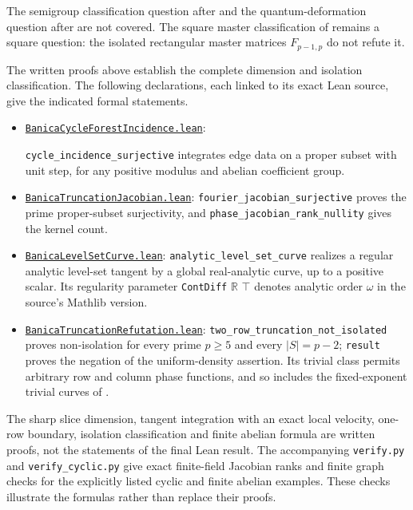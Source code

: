\documentclass[11pt]{article}
\newcommand{\R}{\mathbb R}
\begin{document}
The semigroup classification question after \cite[Theorem~5.9, p.~22]{BOP}
and the quantum-deformation question after \cite[Definition~6.2, p.~22]{BOP}
are not covered. The square master classification of
\cite[Conjecture~3.9]{BOP} remains a square question: the isolated
rectangular master matrices $F_{p-1,p}$ do not refute it.

The written proofs above establish the complete dimension and isolation
classification. The following declarations, each linked to its exact
Lean source, give the indicated formal statements.
\begin{itemize}
\item \href{https://github.com/the-omega-institute/trureturing/blob/43ced8a8460ce89a7c5cae3deeac10e5fc08d565/D5/S3/Quantum/Tomography/Hadamard/BanicaCycleForestIncidence.lean}{\texttt{BanicaCycleForestIncidence.lean}}:
\par\texttt{cycle\_incidence\_surjective} integrates edge data on a proper
subset with unit step, for any positive modulus and abelian coefficient group.
\item \href{https://github.com/the-omega-institute/trureturing/blob/43ced8a8460ce89a7c5cae3deeac10e5fc08d565/D5/S3/Quantum/Tomography/Hadamard/BanicaTruncationJacobian.lean}{\texttt{BanicaTruncationJacobian.lean}}:
\texttt{fourier\_jacobian\_surjective} proves the prime proper-subset
surjectivity, and \texttt{phase\_jacobian\_rank\_nullity} gives the kernel count.
\item \href{https://github.com/the-omega-institute/trureturing/blob/43ced8a8460ce89a7c5cae3deeac10e5fc08d565/D5/S3/Quantum/Tomography/Hadamard/BanicaLevelSetCurve.lean}{\texttt{BanicaLevelSetCurve.lean}}:
\texttt{analytic\_level\_set\_curve} realizes a regular analytic
level-set tangent by a global real-analytic curve, up to a positive scalar.
Its regularity parameter \texttt{ContDiff} $\R$ $\top$ denotes
analytic order $\omega$ in the source's Mathlib version.
\item \href{https://github.com/the-omega-institute/trureturing/blob/43ced8a8460ce89a7c5cae3deeac10e5fc08d565/D5/S3/Quantum/Tomography/Hadamard/BanicaTruncationRefutation.lean}{\texttt{BanicaTruncationRefutation.lean}}:
\texttt{two\_row\_truncation\_not\_isolated} proves non-isolation for every
prime $p\geq5$ and every $|S|=p-2$; \texttt{result} proves the negation
of the uniform-density assertion. Its trivial class permits arbitrary
row and column phase functions, and so includes the fixed-exponent
trivial curves of \cite[Definition 1.3]{BOP}.
\end{itemize}
The sharp slice dimension, tangent integration with an exact local
velocity, one-row boundary, isolation classification and finite abelian
formula are written proofs, not the statements of the final Lean result.
The accompanying \texttt{verify.py} and \texttt{verify\_cyclic.py} give
exact finite-field Jacobian ranks and finite graph checks for the
explicitly listed cyclic and finite abelian examples. These checks
illustrate the formulas rather than replace their proofs.
\end{document}
